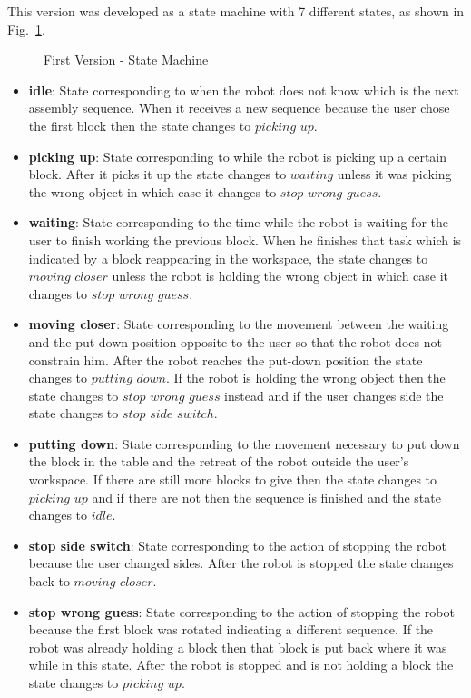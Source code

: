 This version was developed as a state machine with 7 different states, as shown in Fig.~\ref{fig:demo1_state_machine}.

\begin{figure}[H]%
    \centering
    
    \caption{First Version - State Machine}
    \label{fig:demo1_state_machine}
\end{figure}

\begin{itemize}
    \item \textbf{idle}: State corresponding to when the robot does not know which is the next assembly sequence. When it receives a new sequence because the user chose the first block then the state changes to $picking$ $up$.
    \item \textbf{picking up}: State corresponding to while the robot is picking up a certain block. After it picks it up the state changes to $waiting$ unless it was picking the wrong object in which case it changes to $stop$ $wrong$ $guess$.
    \item \textbf{waiting}: State corresponding to the time while the robot is waiting for the user to finish working the previous block. When he finishes that task which is indicated by a block reappearing in the workspace, the state changes to $moving$ $closer$ unless the robot is holding the wrong object in which case it changes to $stop$ $wrong$ $guess$.
    \item \textbf{moving closer}: State corresponding to the movement between the waiting and the put-down position opposite to the user so that the robot does not constrain him. After the robot reaches the put-down position the state changes to $putting$ $down$. If the robot is holding the wrong object then the state changes to $stop$ $wrong$ $guess$ instead and if the user changes side the state changes to $stop$ $side$ $switch$.
    \item \textbf{putting down}: State corresponding to the movement necessary to put down the block in the table and the retreat of the robot outside the user's workspace. If there are still more blocks to give then the state changes to $picking$ $up$ and if there are not then the sequence is finished and the state changes to $idle$.
    \item \textbf{stop side switch}: State corresponding to the action of stopping the robot because the user changed sides. After the robot is stopped the state changes back to $moving$ $closer$.
    \item \textbf{stop wrong guess}: State corresponding to the action of stopping the robot because the first block was rotated indicating a different sequence. If the robot was already holding a block then that block is put back where it was while in this state. After the robot is stopped and is not holding a block the state changes to $picking$ $up$.
\end{itemize}

